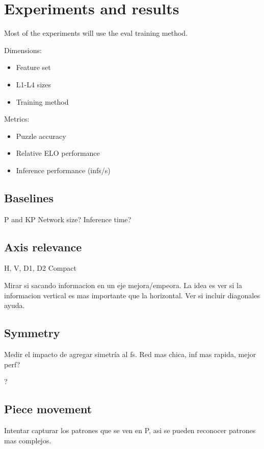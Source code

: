 \section{Experiments and results}


Most of the experiments will use the eval training method.

Dimensions:

\begin{itemize}
\item Feature set
\item L1-L4 sizes
\item Training method
\end{itemize}

Metrics:

\begin{itemize}
\item Puzzle accuracy
\item Relative ELO performance
\item Inference performance (infs/s)
\end{itemize}

\subsection{Baselines}

P and KP
Network size?
Inference time?

\subsection{Axis relevance}

H, V, D1, D2
Compact

Mirar si sacando informacion en un eje mejora/empeora. La idea es ver si la informacion vertical es mas importante que la horizontal. Ver si incluir diagonales ayuda.

\subsection{Symmetry}

Medir el impacto de agregar simetría al fs. Red mas chica, inf mas rapida, mejor perf?

?

\subsection{Piece movement}

Intentar capturar los patrones que se ven en P, asi se pueden reconocer patrones mas complejos.

